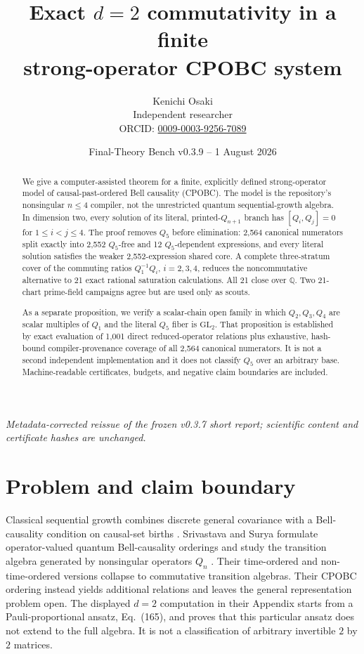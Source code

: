 \documentclass[11pt]{article}
\title{\textbf{Exact \(d=2\) commutativity in a finite\\
strong-operator CPOBC system}}
\author{Kenichi Osaki\\
\small Independent researcher\\
\small ORCID: \href{https://orcid.org/0009-0003-9256-7089}{0009-0003-9256-7089}}
\date{Final-Theory Bench v0.3.9 -- 1 August 2026}
\theoremstyle{remark}
\theoremstyle{plain}
\newcommand{\QQ}{\mathbb{Q}}
\newcommand{\GL}{\mathrm{GL}}
\begin{document}
\maketitle

\begin{center}
\small\emph{Metadata-corrected reissue of the frozen v0.3.7 short report;
scientific content and certificate hashes are unchanged.}
\end{center}

\begin{abstract}
We give a computer-assisted theorem for a finite, explicitly defined
strong-operator model of causal-past-ordered Bell causality (CPOBC).
The model is the repository's nonsingular \(n\leq 4\) compiler, not the
unrestricted quantum sequential-growth algebra.  In dimension two, every
solution of its literal, printed-\(Q_{n+1}\) branch has
\([Q_i,Q_j]=0\) for \(1\leq i<j\leq 4\).  The proof removes \(Q_5\)
before elimination: 2,564 canonical numerators split exactly into 2,552
\(Q_5\)-free and 12 \(Q_5\)-dependent expressions, and every literal
solution satisfies the weaker 2,552-expression shared core.  A complete
three-stratum cover of the commuting ratios \(Q_1^{-1}Q_i\), \(i=2,3,4\),
reduces the noncommutative alternative to 21 exact rational saturation
calculations.  All 21 close over \(\QQ\).  Two 21-chart prime-field
campaigns agree but are used only as scouts.

As a separate proposition, we verify a scalar-chain open family in which
\(Q_2,Q_3,Q_4\) are scalar multiples of \(Q_1\) and the literal \(Q_5\)
fiber is \(\GL_2\).  That proposition is established by exact evaluation
of 1,001 direct reduced-operator relations plus exhaustive, hash-bound
compiler-provenance coverage of all 2,564 canonical numerators.  It is not
a second independent implementation and it does not classify \(Q_5\) over
an arbitrary base.  Machine-readable certificates, budgets, and negative
claim boundaries are included.
\end{abstract}

\section{Problem and claim boundary}

Classical sequential growth combines discrete general covariance with a
Bell-causality condition on causal-set births
\cite{RideoutSorkin2000}.  Srivastava and Surya formulate operator-valued
quantum Bell-causality orderings and study the transition algebra generated
by nonsingular operators \(Q_n\) \cite{SrivastavaSurya2026}.  Their
time-ordered and non-time-ordered versions collapse to commutative
transition algebras.  Their CPOBC ordering instead yields additional
relations and leaves the general representation problem open.  The
displayed \(d=2\) computation in their Appendix starts from a
Pauli-proportional ansatz, Eq.\ (165), and proves that this particular
ansatz does not extend to the full algebra.  It is not a classification of
arbitrary invertible \(2\) by \(2\) matrices.
\end{document}
